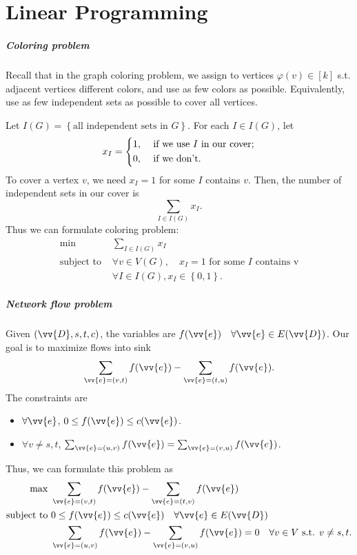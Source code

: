 \chapter{Linear Programming}
\paragraph{Coloring problem}
Recall that in the graph coloring problem, we assign to vertices \(\varphi (v) \in [k]\) s.t. adjacent vertices different colors, and use as few colors as possible. Equivalently, use as few independent sets as possible to cover all vertices. 

Let \(I(G) = \left\{ \text{all independent sets in } G  \right\} \). For each \(I \in I(G)\), let 
\[
    x_I = \begin{dcases}
        1, &\text{ if we use } I \text{ in our cover}  ;\\
        0, &\text{ if we don't} .
    \end{dcases}
\] 
To cover a vertex \(v\), we need \(x_I = 1\) for some \(I\) contains \(v\). Then, the number of independent sets in our cover is 
\[
    \sum_{I \in I(G)} x_I. 
\]     
Thus we can formulate coloring problem:
\[
    \begin{aligned}
        \min~ & \sum_{I \in I(G)} x_I   \\
          \text{subject to }   &  \forall v \in V(G), \quad x_I = 1 \text{ for some } I \text{ contains v} \\
            & \forall I \in I(G), x_I \in \left\{ 0, 1 \right\}.
    \end{aligned}
\]

\paragraph{Network flow problem}
Given \((\vv{D}, s, t, c)\), the variables are \(f(\vv{e}) \quad \forall \vv{e} \in E(\vv{D})\). Our goal is to maximize flows into sink 
\[
    \sum_{\vv{e} = (v, t)} f(\vv{e}) - \sum_{\vv{e} = (t, u)} f(\vv{e}).  
\]  
The constraints are 
\begin{itemize}
    \item \(\forall \vv{e}\), \(0 \le f(\vv{e}) \le c(\vv{e})\). 
    \item \(\forall v \neq s, t\), \(\sum_{\vv{e} = (u, v)} f(\vv{e}) = \sum_{\vv{e} = (v, u)} f(\vv{e}) \).     
\end{itemize}

Thus, we can formulate this problem as 
\[
    \begin{aligned}
        \max~ & \sum_{\vv{e} = (v, t)} f(\vv{e}) - \sum_{\vv{e} = (t, v)} f(\vv{e})    \\
           \text{subject to }  & 0 \le f(\vv{e}) \le c(\vv{e}) \quad \forall \vv{e} \in E(\vv{D})  \\
            & \sum_{\vv{e} = (u, v)} f(\vv{e}) - \sum_{\vv{e} = (v, u)} f(\vv{e}) = 0 \quad \forall v \in V \text{ s.t. } v \neq s, t.  
    \end{aligned}
\]

